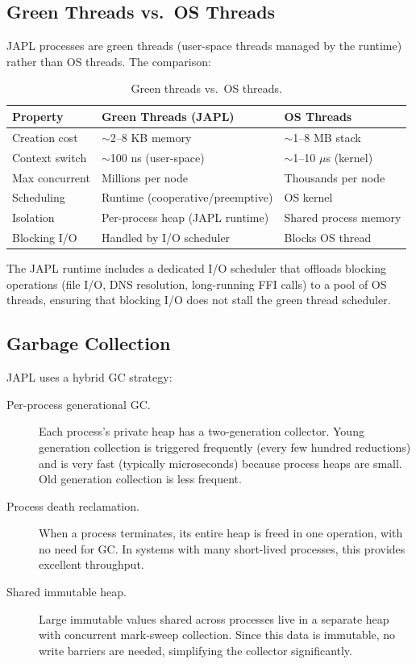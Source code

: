 \documentclass[11pt,a4paper]{article}
\begin{document}
\subsection{Green Threads vs.\ OS Threads}

JAPL processes are green threads (user-space threads managed by the runtime) rather than OS threads. The comparison:

\begin{table}[H]
\centering
\small
\caption{Green threads vs.\ OS threads.}
\label{tab:threads}
\begin{tabular}{@{}lll@{}}
\toprule
\textbf{Property} & \textbf{Green Threads (JAPL)} & \textbf{OS Threads} \\
\midrule
Creation cost        & $\sim$2--8 KB memory            & $\sim$1--8 MB stack \\
Context switch       & $\sim$100 ns (user-space)       & $\sim$1--10 $\mu$s (kernel) \\
Max concurrent       & Millions per node               & Thousands per node \\
Scheduling           & Runtime (cooperative/preemptive) & OS kernel \\
Isolation            & Per-process heap (JAPL runtime)  & Shared process memory \\
Blocking I/O         & Handled by I/O scheduler        & Blocks OS thread \\
\bottomrule
\end{tabular}
\end{table}

The JAPL runtime includes a dedicated I/O scheduler that offloads blocking operations (file I/O, DNS resolution, long-running FFI calls) to a pool of OS threads, ensuring that blocking I/O does not stall the green thread scheduler.

\subsection{Garbage Collection}

JAPL uses a hybrid GC strategy:

\begin{description}
\item[Per-process generational GC.] Each process's private heap has a two-generation collector. Young generation collection is triggered frequently (every few hundred reductions) and is very fast (typically microseconds) because process heaps are small. Old generation collection is less frequent.

\item[Process death reclamation.] When a process terminates, its entire heap is freed in one operation, with no need for GC. In systems with many short-lived processes, this provides excellent throughput.

\item[Shared immutable heap.] Large immutable values shared across processes live in a separate heap with concurrent mark-sweep collection. Since this data is immutable, no write barriers are needed, simplifying the collector significantly.
\end{description}
\end{document}
